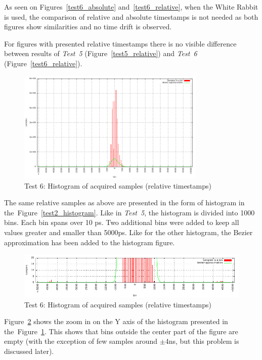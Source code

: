 \documentclass[a4paper, 12pt]{article}
\begin{document}
As seen on Figures~\ref{test6_absolute} and~\ref{test6_relative}, when
the White Rabbit is used, the comparison of relative and absolute timestamps
is not needed as both figures show similarities and no time drift is observed.

For figures with presented relative timestamps there is no visible difference
between results of \textit{Test~5} (Figure~\ref{test5_relative}) and
\textit{Test~6} (Figure~\ref{test6_relative}).

\FloatBarrier

\begin{figure}[ht!]
  \centering
  \includegraphics[width=0.80\textwidth]{img/test6_histogram.pdf}
  \caption{Test 6: Histogram of acquired samples (relative timestamps)}
  \label{test6_histogram}
\end{figure}

The same relative samples as above are
presented in the form of histogram in the~Figure~\ref{test2_histogram}.
Like in \textit{Test~5}, the histogram is divided into 1000 bins.
Each bin spans over 10 ps.
Two additional bins were added to keep all values greater and smaller than
5000ps.
Like for the other histogram,
the Bezier approximation has been added to the histogram figure.

\begin{figure}[ht!]
  \centering
  \includegraphics[width=1\textwidth]{img/test6_histogram_zoomy.pdf}
  \caption{Test 6: Histogram of acquired samples (relative timestamps)}
  \label{test6_histogram_zoomy}
\end{figure}

Figure~\ref{test6_histogram_zoomy} shows the zoom in on the Y axis of
the histogram presented in the~Figure~\ref{test6_histogram}.
This shows that bins outside the center part of the figure are empty
(with the exception of few samples around $\pm$4ns, but this problem is
discussed later).
\end{document}
